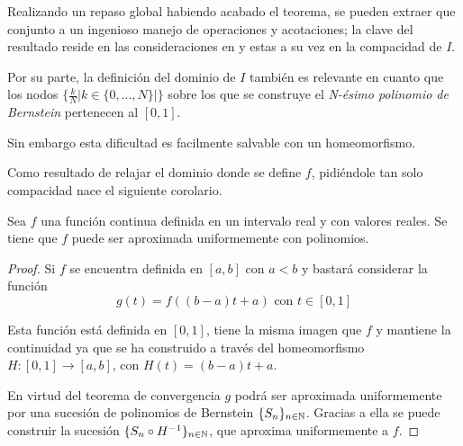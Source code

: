 %

Realizando un repaso global habiendo acabado el teorema, se pueden extraer que conjunto a un ingenioso manejo de operaciones y acotaciones; la clave del resultado reside  en las consideraciones
en   y estas a su vez en la 
compacidad de $I$.

Por su parte, la definición del dominio de $I$ también es relevante en 
cuanto que los nodos $\{ \frac{k}{N} | k\in \{0,..., N\} |  \}$ sobre los que se construye el \textit{N-ésimo polinomio de Bernstein} pertenecen al $[0,1]$.

Sin embargo esta dificultad es facilmente salvable con un homeomorfismo. 

Como resultado de relajar el dominio donde se define $f$, pidiéndole tan solo
compacidad nace el siguiente corolario.  

\begin{corolario} \label{teo:TeoremaAproximacionWeierstrass}
    Sea $f$ una función continua definida en un intervalo real y con valores reales. Se tiene que $f$ puede ser aproximada uniformemente con polinomios. 
\end{corolario}  

\begin{proof}
    Si $f$ se encuentra definida en $[a,b]$ con $a<b$ y bastará considerar la función
    \begin{equation*}
        g(t) = f( (b-a)t + a) \text{ con } t \in [0,1]
    \end{equation*}

    Esta función está definida en $[0,1]$, tiene la misma imagen que $f$ y 
    mantiene la continuidad ya que se ha construido a través del homeomorfismo 
    $H:[0,1] \longrightarrow [a,b]$, con $H(t) = (b-a)t + a$. 

    En virtud del teorema de convergencia 
    $g$ podrá ser aproximada uniformemente por una sucesión de polinomios de Bernstein $\{S_n\}_{n \in \mathbb{N}}$. Gracias a ella se puede
    construir la sucesión $\{S_n \circ H^{-1}\}_{n \in \mathbb{N}}$, que aproxima uniformemente a $f$. 
\end{proof}